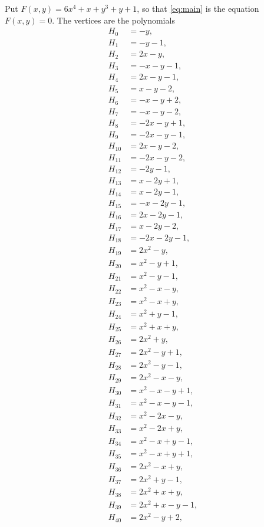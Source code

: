\documentclass[11pt]{article}
\begin{document}
Put $F(x,y)=6x^{4}+x+y^{3}+y+1$, so that \eqref{eq:main} is the equation $F(x,y)=0$. The vertices are the polynomials
\begin{align*}
H_{0}&=-y,\\
H_{1}&=-y-1,\\
H_{2}&=2x-y,\\
H_{3}&=-x-y-1,\\
H_{4}&=2x-y-1,\\
H_{5}&=x-y-2,\\
H_{6}&=-x-y+2,\\
H_{7}&=-x-y-2,\\
H_{8}&=-2x-y+1,\\
H_{9}&=-2x-y-1,\\
H_{10}&=2x-y-2,\\
H_{11}&=-2x-y-2,\\
H_{12}&=-2y-1,\\
H_{13}&=x-2y+1,\\
H_{14}&=x-2y-1,\\
H_{15}&=-x-2y-1,\\
H_{16}&=2x-2y-1,\\
H_{17}&=x-2y-2,\\
H_{18}&=-2x-2y-1,\\
H_{19}&=2x^{2}-y,\\
H_{20}&=x^{2}-y+1,\\
H_{21}&=x^{2}-y-1,\\
H_{22}&=x^{2}-x-y,\\
H_{23}&=x^{2}-x+y,\\
H_{24}&=x^{2}+y-1,\\
H_{25}&=x^{2}+x+y,\\
H_{26}&=2x^{2}+y,\\
H_{27}&=2x^{2}-y+1,\\
H_{28}&=2x^{2}-y-1,\\
H_{29}&=2x^{2}-x-y,\\
H_{30}&=x^{2}-x-y+1,\\
H_{31}&=x^{2}-x-y-1,\\
H_{32}&=x^{2}-2x-y,\\
H_{33}&=x^{2}-2x+y,\\
H_{34}&=x^{2}-x+y-1,\\
H_{35}&=x^{2}-x+y+1,\\
H_{36}&=2x^{2}-x+y,\\
H_{37}&=2x^{2}+y-1,\\
H_{38}&=2x^{2}+x+y,\\
H_{39}&=2x^{2}+x-y-1,\\
H_{40}&=2x^{2}-y+2,\\

\end{align*}
\end{document}
